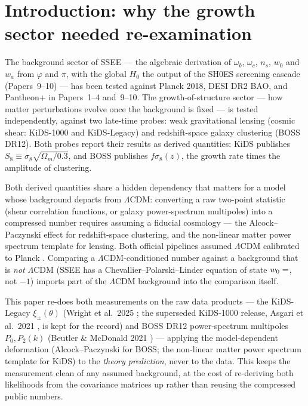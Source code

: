 \documentclass[12pt,a4paper]{article}
\newcommand{\SSEE}{\textsc{SSEE}}
\begin{document}
\clearpage
{\small\tableofcontents}
\clearpage

\section{Introduction: why the growth sector needed re-examination}

The background sector of \SSEE{} --- the algebraic derivation of $\omega_b$,
$\omega_c$, $n_s$, $w_0$ and $w_a$ from $\varphi$ and $\pi$, with the global $H_0$
the output of the SH0ES screening cascade (Papers~9--10) --- has been tested
against Planck 2018, DESI DR2 BAO, and Pantheon+ in Papers~1--4 and~9--10. The
growth-of-structure sector --- how matter perturbations evolve once the
background is fixed --- is tested independently, against two late-time probes:
weak gravitational lensing (cosmic shear: KiDS-1000 and KiDS-Legacy) and
redshift-space galaxy clustering (BOSS DR12). Both probes report their results as
derived quantities: KiDS publishes $S_8\equiv\sigma_8\sqrt{\Omega_m/0.3}$, and BOSS
publishes $f\sigma_8(z)$, the growth rate times the amplitude of clustering.

Both derived quantities share a hidden dependency that matters for a model
whose background departs from $\Lambda$CDM: converting a raw two-point
statistic (shear correlation functions, or galaxy power-spectrum multipoles)
into a compressed number requires assuming a fiducial cosmology --- the
Alcock--Paczynski effect \citep{AlcockPaczynski1979} for redshift-space
clustering, and the non-linear matter power spectrum template for lensing.
Both official pipelines assumed $\Lambda$CDM calibrated to Planck
\citep{Planck2020}. Comparing a $\Lambda$CDM-conditioned number against a
background that is \emph{not} $\Lambda$CDM (\SSEE{} has a
Chevallier--Polarski--Linder \citep{ChevallierPolarski2001,Linder2003}
equation of state $w_0=\val{W0_d6}$, not $-1$) imports part of the $\Lambda$CDM
background into the comparison itself.

This paper re-does both measurements on the raw data products --- the KiDS-Legacy
$\xi_\pm(\theta)$ (Wright et al.~2025 \citep{Wright2025}; the superseded KiDS-1000 release,
Asgari et al.~2021 \citep{Asgari2021}, is kept for the record) and BOSS DR12 power-spectrum multipoles
$P_0,P_2(k)$ (Beutler \& McDonald 2021 \citep{BeutlerMcDonald2021}) --- applying the model-dependent
deformation (Alcock--Paczynski for BOSS; the non-linear matter power spectrum
template for KiDS) to the \emph{theory prediction}, never to the data. This
keeps the measurement clean of any assumed background, at the cost of
re-deriving both likelihoods from the covariance matrices up rather than
reusing the compressed public numbers.
\end{document}
